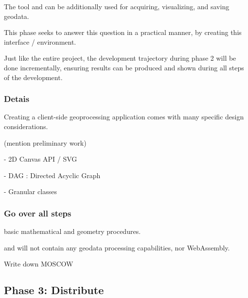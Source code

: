 The tool and can be additionally used for acquiring, visualizing, and saving geodata.


This phase seeks to answer this question in a practical manner, by creating this interface / environment.






Just like the entire project, the development trajectory during phase 2 will be done incrementally, ensuring results can be produced and shown during all steps of the development. 




\subsubsection*{Detais}


Creating a client-side geoprocessing application comes with many specific design considerations. 



(mention preliminary work)

- 2D Canvas API / SVG 

- DAG : Directed Acyclic Graph

- Granular classes 


\subsubsection*{Go over all steps}


basic mathematical and geometry procedures. 

and will not contain any geodata processing capabilities, nor WebAssembly. 

Write down MOSCOW






\subsection{Phase 3: Distribute}

